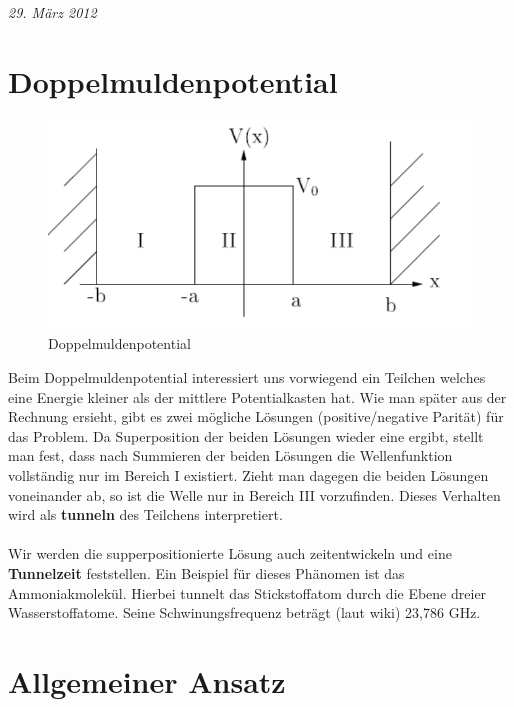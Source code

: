 




\textit{29. März 2012}

\setcounter{section}{1}
\section*{Doppelmuldenpotential}


\begin{figure}[htbp]
  \centering
  \includegraphics{./sgl_doppelmuldenpotential_pics/pic01_v.pdf}
  \caption{Doppelmuldenpotential}
  \label{fig:fg1}
\end{figure}

Beim Doppelmuldenpotential interessiert uns vorwiegend ein Teilchen welches eine Energie kleiner als der mittlere Potentialkasten hat. Wie man später aus der Rechnung ersieht, gibt es zwei mögliche Lösungen (positive/negative Parität) für das Problem. Da Superposition der beiden Lösungen wieder eine ergibt, stellt man fest, dass nach Summieren der beiden Lösungen die Wellenfunktion vollständig nur im Bereich I existiert. Zieht man dagegen die beiden Lösungen voneinander ab, so ist die Welle nur in Bereich III vorzufinden. Dieses Verhalten wird als \textbf{tunneln} des Teilchens interpretiert.\\
\\
Wir werden die supperpositionierte Lösung auch zeitentwickeln und eine \textbf{Tunnelzeit} feststellen. Ein Beispiel für dieses Phänomen ist das Ammoniakmolekül. Hierbei tunnelt das Stickstoffatom durch die Ebene dreier Wasserstoffatome. Seine Schwinungsfrequenz beträgt (laut wiki) 23,786 GHz.


\section*{Allgemeiner Ansatz}

